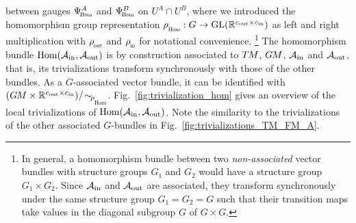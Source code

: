 between gauges $\PsiHom^A$ and $\PsiHom^B$ on $U^A\cap U^B$, where we introduced the homomorphism group representation $\rhoHom:G\to\GL{\R^{\cout\times\cin}}$ as left and right multiplication with $\rhoout$ and $\rhoin$ for notational convenience.%
\footnote{
    In general, a homomorphism bundle between two \emph{non-associated} vector bundles with structure groups $G_1$ and $G_2$ would have a structure group $G_1\times G_2$.
    Since $\mathcal{A}_\textup{in}$ and $\mathcal{A}_\textup{out}$ are associated, they transform synchronously under the same structure group $G_1=G_2=G$ such that their transition maps take values in the diagonal subgroup $G$ of $G\times G$.
}
The homomorphism bundle $\operatorname{Hom}(\mathcal{A}_\textup{in},\mathcal{A}_\textup{out})$ is by construction associated to $T\mkern-1.5muM$, $G\mkern-1.4muM$, $\mathcal{A}_\textup{in}$ and $\mathcal{A}_\textup{out}$, that is, its trivializations transform synchronously with those of the other bundles.
As a $G$-associated vector bundle, it can be identified with $(\GM\times\R^{\cout\times\cin})/\!\sim_{\!\rhoHom}$.
Fig.~\ref{fig:trivialization_hom} gives an overview of the local trivializations of $\operatorname{Hom}(\mathcal{A}_\textup{in},\mathcal{A}_\textup{out})$.
Note the similarity to the trivializations of the other associated $G$-bundles in Fig.~\ref{fig:trivializations_TM_FM_A}.

